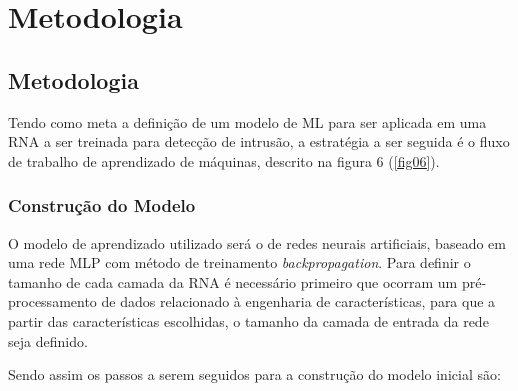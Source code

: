 \part{Metodologia}
\chapter[Metodologia]{Metodologia}

Tendo como meta a definição de um modelo de ML para ser aplicada em uma RNA a ser treinada para detecção de intrusão, a estratégia a ser seguida é o fluxo de trabalho de aprendizado de máquinas, descrito na figura 6 (\ref{fig06}).

\section{Construção do Modelo}

    O modelo de aprendizado utilizado será o de redes neurais artificiais, baseado em uma rede MLP com método de treinamento \textit{backpropagation}. Para definir o tamanho de cada camada da RNA é necessário primeiro que ocorram um pré-processamento de dados relacionado à engenharia de características, para que a partir das características escolhidas, o tamanho da camada de entrada da rede seja definido.

    Sendo assim os passos a serem seguidos para a construção do modelo inicial são:


